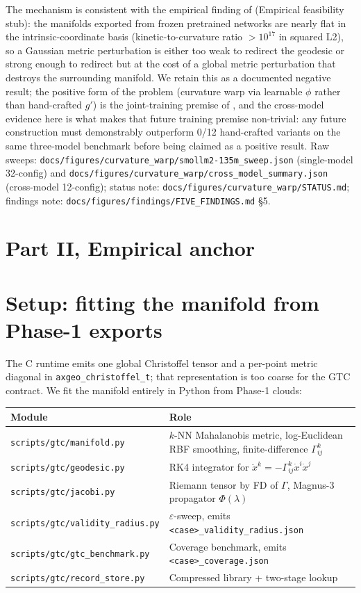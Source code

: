 \documentclass[11pt]{article}
\begin{document}
The mechanism is consistent with the empirical finding of
 (Empirical feasibility stub): the manifolds
exported from frozen pretrained networks are nearly flat in the
intrinsic-coordinate basis (kinetic-to-curvature ratio $> 10^{17}$
in squared L2), so a Gaussian metric perturbation is either too weak
to redirect the geodesic or strong enough to redirect but at the cost
of a global metric perturbation that destroys the surrounding
manifold. We retain this as a documented negative result; the positive
form of the problem (curvature warp via learnable $\phi$ rather
than hand-crafted $g'$) is the joint-training premise of
, and the cross-model evidence here is what
makes that future training premise non-trivial: any future
construction must demonstrably outperform 0/12 hand-crafted variants
on the same three-model benchmark before being claimed as a positive
result. Raw sweeps:
\texttt{docs/figures/curvature\_warp/smollm2-135m\_sweep.json}
(single-model 32-config) and
\texttt{docs/figures/curvature\_warp/cross\_model\_summary.json}
(cross-model 12-config); status note:
\texttt{docs/figures/curvature\_warp/STATUS.md};
findings note:
\texttt{docs/figures/findings/FIVE\_FINDINGS.md} \S5.

\section*{Part II, Empirical anchor}

\section{Setup: fitting the manifold from Phase-1 exports}
\label{sec:setup}

The C runtime emits one global Christoffel tensor and a per-point metric
diagonal in \texttt{axgeo\_christoffel\_t}; that representation is too coarse
for the GTC contract. We fit the manifold entirely in Python from Phase-1
clouds:

\begin{center}\small
\begin{tabularx}{\linewidth}{lX}
\toprule
Module & Role\\
\midrule
\texttt{scripts/gtc/manifold.py}      & $k$-NN Mahalanobis metric, log-Euclidean RBF smoothing, finite-difference $\Gamma^k_{ij}$\\
\texttt{scripts/gtc/geodesic.py}      & RK4 integrator for $\ddot x^k = -\Gamma^k_{ij}\dot x^i \dot x^j$\\
\texttt{scripts/gtc/jacobi.py}        & Riemann tensor by FD of $\Gamma$, Magnus-3 propagator $\Phi(\lambda)$\\
\texttt{scripts/gtc/validity\_radius.py} & $\varepsilon$-sweep, emits \texttt{<case>\_validity\_radius.json}\\
\texttt{scripts/gtc/gtc\_benchmark.py} & Coverage benchmark, emits \texttt{<case>\_coverage.json}\\
\texttt{scripts/gtc/record\_store.py} & Compressed library + two-stage lookup\\
\bottomrule
\end{tabularx}
\end{center}
\end{document}
